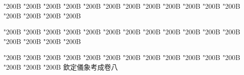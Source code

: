 \begin{正文}
\char"200B\relax{}
\char"200B\relax{}
\char"200B\relax{}
\char"200B\relax{}
\char"200B\relax{}
\char"200B\relax{}
\char"200B\relax{}
\char"200B\relax{}
\char"200B\relax{}
\char"200B\relax{}
\char"200B\relax{}
\char"200B\relax{}
\char"200B\relax{}
\char"200B\relax{}
\char"200B\relax{}
\char"200B\relax
{}\par
\end{正文}\clearpage
{}
\begin{正文}
\char"200B\relax{}
\char"200B\relax{}
\char"200B\relax{}
\char"200B\relax{}
\char"200B\relax{}
\char"200B\relax{}
\char"200B\relax{}
\char"200B\relax{}
\char"200B\relax{}
\char"200B\relax{}
\char"200B\relax{}
\char"200B\relax{}
\char"200B\relax{}
\char"200B\relax{}
\char"200B\relax{}
\char"200B\relax
{}\par
\end{正文}\clearpage
{}
\begin{正文}
\char"200B\relax{}
\char"200B\relax{}
\char"200B\relax{}
\char"200B\relax{}
\char"200B\relax{}
\char"200B\relax{}
\char"200B\relax{}
\char"200B\relax{}
\char"200B\relax{}
\char"200B\relax{}
\char"200B\relax{}
\char"200B\relax{}
\char"200B\relax{}
\char"200B\relax{}
\char"200B\relax{}
欽定儀象考成卷八
\par

\par\end{正文}\clearpage
